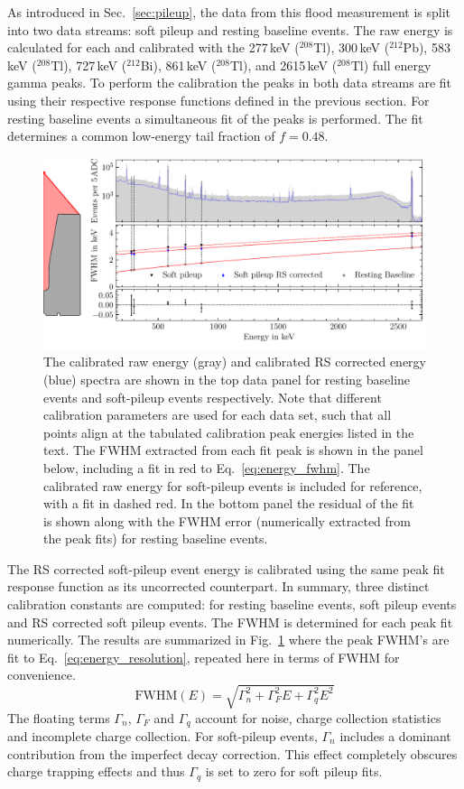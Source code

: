 As introduced in Sec.~\ref{sec:pileup}, the data from this flood measurement is split into two data streams: soft pileup and resting baseline events. The raw energy is calculated for each and calibrated with the 277\,keV ($^{208}$Tl), 300\,keV ($^{212}$Pb), 583\,keV ($^{208}$Tl), 727\,keV ($^{212}$Bi), 861\,keV ($^{208}$Tl), and 2615\,keV ($^{208}$Tl) full energy gamma peaks. To perform the calibration the peaks in both data streams are fit using their respective response functions defined in the previous section. For resting baseline events a simultaneous fit of the peaks is performed. The fit determines a common low-energy tail fraction of $f = 0.48$.
\begin{figure}[htb]
    \centering
    \includegraphics[width=6in]{figs/param/fwhm_peaks.pdf}
    \caption{The calibrated raw energy (gray) and calibrated RS corrected energy (blue) spectra are shown in the top data panel for resting baseline events and soft-pileup events respectively. Note that different calibration parameters are used for each data set, such that all points align at the tabulated calibration peak energies listed in the text. The FWHM extracted from each fit peak is shown in the panel below, including a fit in red to Eq.~\ref{eq:energy_fwhm}. The calibrated raw energy for soft-pileup events is included for reference, with a fit in dashed red. In the bottom panel the residual of the fit is shown along with the FWHM error (numerically extracted from the peak fits) for resting baseline events.}
    \label{fig:fwhm_peaks}
\end{figure}

The RS corrected soft-pileup event energy is calibrated using the same peak fit response function as its uncorrected counterpart. In summary, three distinct calibration constants are computed: for resting baseline events, soft pileup events and RS corrected soft pileup events. The FWHM is determined for each peak fit numerically. The results are summarized in Fig.~\ref{fig:fwhm_peaks} where the peak FWHM's are fit to Eq.~\ref{eq:energy_resolution}, repeated here in terms of FWHM for convenience. 
\begin{equation}
	\text{FWHM}(E) = \sqrt{\Gamma_n^2 + \Gamma_F^2E + \Gamma_q^2E^2}
	\label{eq:energy_fwhm}
\end{equation}
The floating terms $\Gamma_n$, $\Gamma_F$ and $\Gamma_q$ account for noise, charge collection statistics and incomplete charge collection. For soft-pileup events, $\Gamma_n$ includes a dominant contribution from the imperfect decay correction. This effect completely obscures charge trapping effects and thus $\Gamma_q$ is set to zero for soft pileup fits.  

